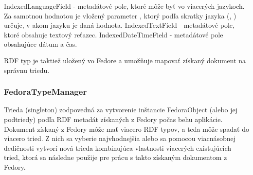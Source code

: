 \documentclass[thesis=M,slovak]{FITthesis}[2013/05/06]
\begin{document}
IndexedLanguageField - metadátové pole, ktoré môže byť vo viacerých jazykoch. Za samotnou hodnotou je vložený parameter , ktorý podľa skratky jazyka (, ) určuje, v akom jazyku je daná hodnota.
IndexedTextField - metadátové pole, ktoré obsahuje textový reťazec.
IndexedDateTimeField - metadátové pole obsahujúce dátum a čas.

RDF typ je taktiež uložený vo Fedore a umožňuje mapovať získaný dokument na správnu triedu.

\subsubsection{FedoraTypeManager}
Trieda (singleton) zodpovedná za vytvorenie inštancie FedoraObject (alebo jej podtriedy) podľa RDF metadát získaných z Fedory počas behu aplikácie. Dokument získaný z Fedory môže mať viacero RDF typov, a teda môže spadať do viacero tried. Z nich sa vyberie najvhodnejšia alebo sa pomocou viacnásobnej dedičnosti vytvorí nová trieda kombinujúca vlastnosti viacerých existujúcich tried,  ktorá sa následne použije pre prácu s takto získaným dokumentom z Fedory.
\end{document}
